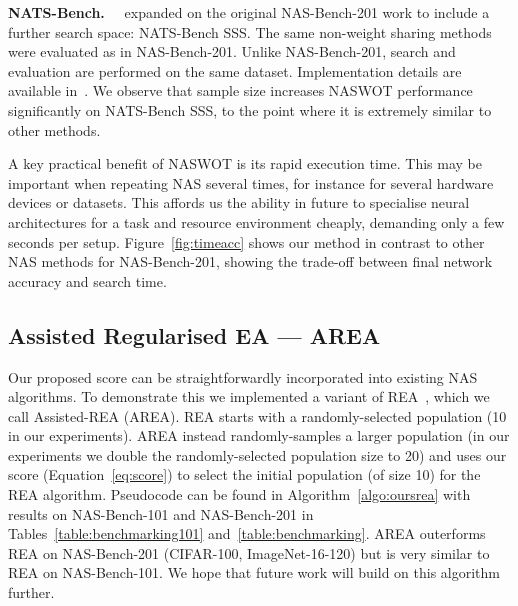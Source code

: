 \documentclass{article}
\begin{document}
\textbf{NATS-Bench.\ }~\citet{dong2021nats} expanded on the original NAS-Bench-201 work to include a further search space: NATS-Bench SSS. The same non-weight sharing methods were evaluated as in NAS-Bench-201. Unlike NAS-Bench-201, search and evaluation are performed on the same dataset. Implementation details are available in~\cite{dong2021nats}. 
We observe that sample size increases NASWOT performance significantly on NATS-Bench SSS, to the point where it is extremely similar to other methods.



A key practical benefit of NASWOT is its rapid execution time. This may be important when repeating NAS several times, for instance for several hardware devices or datasets. This affords us the ability in future to specialise neural architectures for a task and resource environment cheaply, demanding only a few seconds per setup. Figure~\ref{fig:timeacc} shows our method in contrast to other NAS methods for NAS-Bench-201, showing the trade-off between final network accuracy and search time. 



\subsection{Assisted Regularised EA --- AREA}
\label{sec:area}

Our proposed score can be straightforwardly incorporated into existing NAS algorithms. To demonstrate this we implemented a variant of REA~\citep{real2019regularized}, which we call Assisted-REA (AREA). REA starts with a randomly-selected population (10 in our experiments). AREA instead randomly-samples a larger population (in our experiments we double the randomly-selected population size to 20) and uses our score (Equation~\ref{eq:score}) to select the initial population (of size 10) for the REA algorithm. Pseudocode can be found in Algorithm~\ref{algo:oursrea} with results on NAS-Bench-101 and NAS-Bench-201 in Tables~\ref{table:benchmarking101} and~\ref{table:benchmarking}. AREA outerforms REA on NAS-Bench-201 (CIFAR-100, ImageNet-16-120) but is very similar to REA on NAS-Bench-101. We hope that future work will build on this algorithm further.
\end{document}
